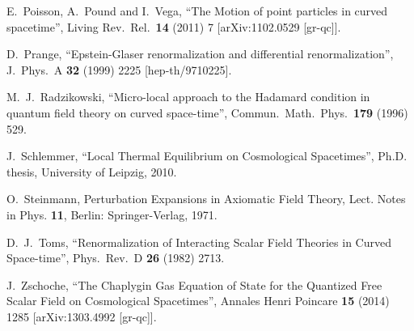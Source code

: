 \documentclass[a4paper,10pt,twoside]{article}
\numberwithin{equation}{section}
\newcounter{and}
\theoremstyle{plain}
\theoremstyle{definition}
\begin{document}
\begin{thebibliography}{100}
  E.~Poisson, A.~Pound and I.~Vega,
  ``The Motion of point particles in curved spacetime'',
  Living Rev.\ Rel.\  {\bf 14} (2011) 7
  [arXiv:1102.0529 [gr-qc]].

  D.~Prange,
  ``Epstein-Glaser renormalization and differential renormalization'',
  J.\ Phys.\ A {\bf 32} (1999) 2225
  [hep-th/9710225]. 

  M.~J.~Radzikowski,
  ``Micro-local approach to the Hadamard condition in quantum field theory on curved space-time'',
  Commun.\ Math.\ Phys.\  {\bf 179} (1996) 529.
  
  J.~Schlemmer, 
  ``Local Thermal Equilibrium on Cosmological Spacetimes'',
  Ph.D. thesis, University of Leipzig, 2010.

  O.~Steinmann,
  Perturbation Expansions in Axiomatic Field Theory,
  Lect. Notes in Phys. \textbf{11}, Berlin: Springer-Verlag, 1971.

  D.~J.~Toms,
  ``Renormalization of Interacting Scalar Field Theories in Curved Space-time'',
  Phys.\ Rev.\ D {\bf 26} (1982) 2713.

  J.~Zschoche,
  ``The Chaplygin Gas Equation of State for the Quantized Free Scalar Field on Cosmological Spacetimes'',
  Annales Henri Poincare {\bf 15} (2014) 1285
  [arXiv:1303.4992 [gr-qc]].

\end{thebibliography}

\end{document}
